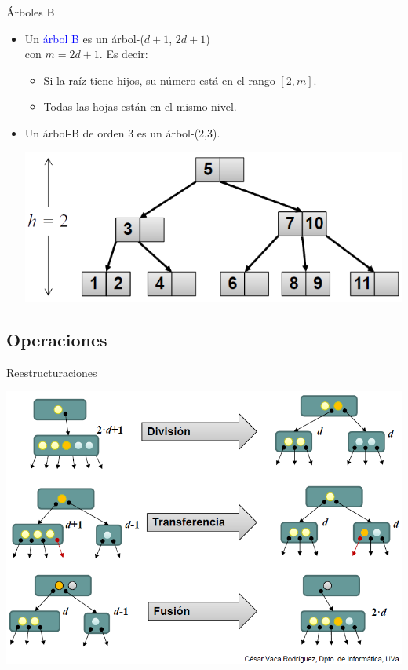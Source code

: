 \documentclass[handout]{beamer} %
\newcommand{\blue}[1]{\textcolor{blue}{#1}}
\newcommand{\redb}[1]{{\color{red!70!black}{#1}}}
\begin{document}
\begin{frame}{Árboles B}
    \begin{itemize}
        \item<1-> Un \blue{árbol B} \redb{de orden $m$} es un árbol-($d+1$, $2d+1$)\\con $m=2d+1$. Es decir:
        \begin{itemize}
            \item Si la raíz tiene hijos, su número está en el rango $[2,m]$.
            \item Todas las hojas están en el mismo nivel.
        \end{itemize}
        \item<2-> Un árbol-B de orden 3 es un árbol-(2,3).
        \begin{center}
            \includegraphics[width=.6\textwidth]{./image/cap3/(23)-tree}
        \end{center}
    \end{itemize}
\end{frame}

\subsection{Operaciones}

\begin{frame}{Reestructuraciones}
    \begin{center}
        \includegraphics[width=.98\textwidth]{./image/cap3/b-tree-reestructurar}
    \end{center}
\end{frame}
\end{document}
